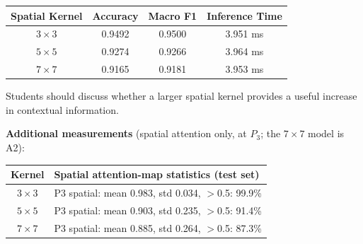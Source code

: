 \documentclass[10pt]{article}
\begin{document}
\begin{center}

\begin{tabular}{|c|c|c|c|}
\hline

\textbf{Spatial Kernel}
&
\textbf{Accuracy}
&
\textbf{Macro F1}
&
\textbf{Inference Time}
\\
\hline

$3\times3$
&
0.9492
&
0.9500
&
3.951 ms
\\
\hline

$5\times5$
&
0.9274
&
0.9266
&
3.964 ms
\\
\hline

$7\times7$
&
0.9165
&
0.9181
&
3.953 ms
\\
\hline

\end{tabular}

\end{center}

Students should discuss whether a larger spatial kernel provides a useful
increase in contextual information.


\textbf{Additional measurements} (spatial attention only, at $P_3$; the $7\times7$ model is A2):

\begin{center}
\end{center}

\begin{center}
\small
\begin{tabular}{|c|p{12cm}|}
\hline
\textbf{Kernel} & \textbf{Spatial attention-map statistics (test set)} \\
\hline
$3\times3$ & P3 spatial: mean 0.983, std 0.034, $>$0.5: 99.9\% \\
\hline
$5\times5$ & P3 spatial: mean 0.903, std 0.235, $>$0.5: 91.4\% \\
\hline
$7\times7$ & P3 spatial: mean 0.885, std 0.264, $>$0.5: 87.3\% \\
\hline
\end{tabular}
\end{center}
\end{document}
